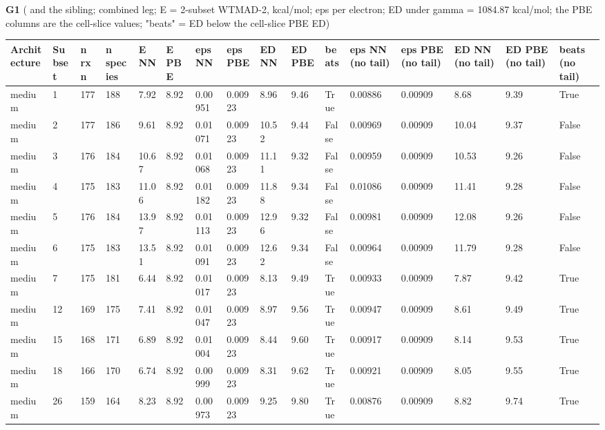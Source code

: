 \documentclass[10pt,a4paper]{article}
\begin{document}
\textbf{G1} ( and the  sibling; combined leg; E = 2-subset WTMAD-2, kcal/mol; eps per electron; ED under gamma = 1084.87 kcal/mol; the PBE columns are the cell-slice values; "beats" = ED below the cell-slice PBE ED)

\begin{landscape}
\begin{tiny}
\begin{longtable}{llllllllllllllll}
\toprule Architecture & Subset & n rxn & n species & E NN & E PBE & eps NN & eps PBE & ED NN & ED PBE & beats & eps NN (no tail) & eps PBE (no tail) & ED NN (no tail) & ED PBE (no tail) & beats (no tail) \\ \midrule \endhead
medium & 1 & 177 & 188 & 7.92 & 8.92 & 0.00951 & 0.00923 & 8.96 & 9.46 & True & 0.00886 & 0.00909 & 8.68 & 9.39 & True \\
medium & 2 & 177 & 186 & 9.61 & 8.92 & 0.01071 & 0.00923 & 10.52 & 9.44 & False & 0.00969 & 0.00909 & 10.04 & 9.37 & False \\
medium & 3 & 176 & 184 & 10.67 & 8.92 & 0.01068 & 0.00923 & 11.11 & 9.32 & False & 0.00959 & 0.00909 & 10.53 & 9.26 & False \\
medium & 4 & 175 & 183 & 11.06 & 8.92 & 0.01182 & 0.00923 & 11.88 & 9.34 & False & 0.01086 & 0.00909 & 11.41 & 9.28 & False \\
medium & 5 & 176 & 184 & 13.97 & 8.92 & 0.01113 & 0.00923 & 12.96 & 9.32 & False & 0.00981 & 0.00909 & 12.08 & 9.26 & False \\
medium & 6 & 175 & 183 & 13.51 & 8.92 & 0.01091 & 0.00923 & 12.62 & 9.34 & False & 0.00964 & 0.00909 & 11.79 & 9.28 & False \\
medium & 7 & 175 & 181 & 6.44 & 8.92 & 0.01017 & 0.00923 & 8.13 & 9.49 & True & 0.00933 & 0.00909 & 7.87 & 9.42 & True \\
medium & 12 & 169 & 175 & 7.41 & 8.92 & 0.01047 & 0.00923 & 8.97 & 9.56 & True & 0.00947 & 0.00909 & 8.61 & 9.49 & True \\
medium & 15 & 168 & 171 & 6.89 & 8.92 & 0.01004 & 0.00923 & 8.44 & 9.60 & True & 0.00917 & 0.00909 & 8.14 & 9.53 & True \\
medium & 18 & 166 & 170 & 6.74 & 8.92 & 0.00999 & 0.00923 & 8.31 & 9.62 & True & 0.00921 & 0.00909 & 8.05 & 9.55 & True \\
medium & 26 & 159 & 164 & 8.23 & 8.92 & 0.00973 & 0.00923 & 9.25 & 9.80 & True & 0.00876 & 0.00909 & 8.82 & 9.74 & True \\

\end{longtable}
\end{tiny}
\end{landscape}
\end{document}
